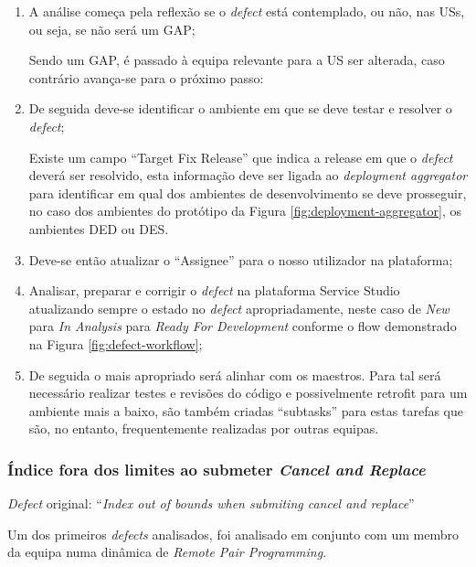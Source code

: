             \begin{enumerate}
                \item A análise começa pela reflexão se o \textit{defect} está contemplado, ou não, nas USs, ou seja, se não será um GAP;
                
                Sendo um GAP, é passado à equipa relevante para a US ser alterada, caso contrário avança-se para o próximo passo: 
                \item De seguida deve-se identificar o ambiente em que se deve testar e resolver o \textit{defect};
                
                Existe um campo ``Target Fix Release'' que indica a release em que o \textit{defect} deverá ser resolvido, esta informação deve ser ligada ao \textit{deployment aggregator} para identificar em qual dos ambientes de desenvolvimento se deve prosseguir, no caso dos ambientes do protótipo da Figura \ref{fig:deployment-aggregator}, os ambientes DED ou DES.  
                \item Deve-se então atualizar o ``Assignee'' para o nosso utilizador na plataforma;
                \item Analisar, preparar e corrigir o \textit{defect} na plataforma Service Studio atualizando sempre o estado no \textit{defect} apropriadamente, neste caso de \textit{New} para \textit{In Analysis} para \textit{Ready For Development} conforme o flow demonstrado na Figura \ref{fig:defect-workflow};
                \item De seguida o mais apropriado será alinhar com os maestros. Para tal será necessário realizar testes e revisões do código e possivelmente retrofit para um ambiente mais a baixo, são também criadas ``subtasks'' para estas tarefas que são, no entanto,  frequentemente realizadas por outras equipas. 
            \end{enumerate}

        \subsubsection{Índice fora dos limites ao submeter \textit{Cancel and Replace}}\label{index_out_of_bounds_defect}

        \textit{Defect} original: ``\textit{Index out of bounds when submiting cancel and replace}''


            Um dos primeiros \textit{defects} analisados, foi analisado em conjunto com um membro da equipa numa dinâmica de \textit{Remote Pair Programming}.

